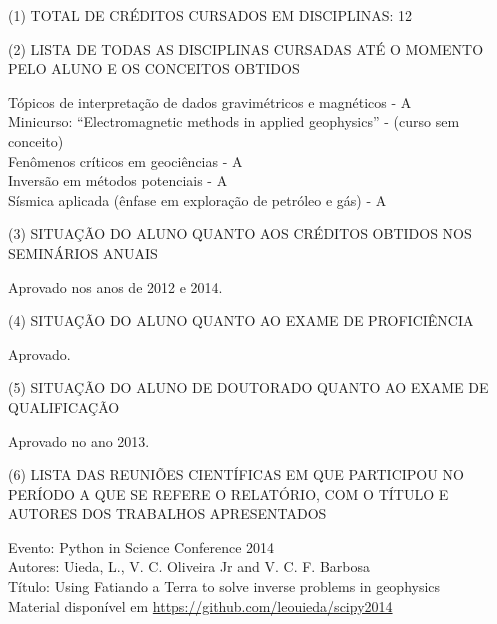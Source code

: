 \documentclass[12pt,a4paper]{article}
\begin{document}
\vspace{1cm}

\begin{flushleft}

\noindent (1) TOTAL DE CRÉDITOS CURSADOS EM DISCIPLINAS: 12

\bigskip

\noindent (2) LISTA DE TODAS AS DISCIPLINAS CURSADAS ATÉ O MOMENTO PELO ALUNO
E OS CONCEITOS OBTIDOS

\bigskip

Tópicos de interpretação de dados gravimétricos e magnéticos - A\\
Minicurso: ``Electromagnetic methods in applied geophysics'' - (curso sem
conceito)\\
Fenômenos críticos em geociências - A\\
Inversão em métodos potenciais - A\\
Sísmica aplicada (ênfase em exploração de petróleo e gás) - A

\bigskip

\noindent (3) SITUAÇÃO DO ALUNO QUANTO AOS CRÉDITOS OBTIDOS NOS SEMINÁRIOS
ANUAIS

\bigskip

Aprovado nos anos de 2012 e 2014.

\bigskip

\noindent (4) SITUAÇÃO DO ALUNO QUANTO AO EXAME DE PROFICIÊNCIA

\bigskip

Aprovado.

\bigskip

\noindent (5) SITUAÇÃO DO ALUNO DE DOUTORADO QUANTO AO EXAME DE QUALIFICAÇÃO

\bigskip

Aprovado no ano 2013.

\bigskip

\noindent (6) LISTA DAS REUNIÕES CIENTÍFICAS EM QUE PARTICIPOU NO PERÍODO A QUE
SE REFERE O RELATÓRIO, COM O TÍTULO E AUTORES DOS TRABALHOS APRESENTADOS

\bigskip

Evento: Python in Science Conference 2014\\
Autores: Uieda, L., V. C. Oliveira Jr and V. C. F. Barbosa\\
Título: Using Fatiando a Terra to solve inverse problems in geophysics\\
Material disponível em
\href{https://github.com/leouieda/scipy2014}{https://github.com/leouieda/scipy2014}


\end{flushleft}
\end{document}
